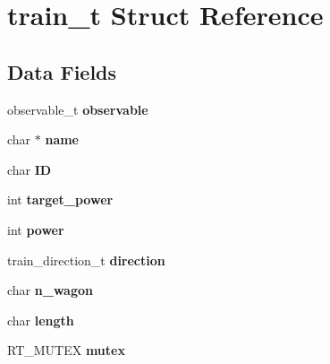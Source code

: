 \hypertarget{structtrain__t}{\section{train\-\_\-t \-Struct \-Reference}
\label{structtrain__t}
}
\subsection*{\-Data \-Fields}
\begin{DoxyCompactItemize}
\item 
\hypertarget{structtrain__t_a39d603215eb7e0ade0ee0fbbb14f0685}{observable\-\_\-t {\bfseries observable}}\label{structtrain__t_a39d603215eb7e0ade0ee0fbbb14f0685}

\item 
\hypertarget{structtrain__t_a866388e08694084c03d04d70c3c9541e}{char $\ast$ {\bfseries name}}\label{structtrain__t_a866388e08694084c03d04d70c3c9541e}

\item 
\hypertarget{structtrain__t_ab1d435bd12429c65c6cacfcba690e2f6}{char {\bfseries \-I\-D}}\label{structtrain__t_ab1d435bd12429c65c6cacfcba690e2f6}

\item 
\hypertarget{structtrain__t_aaca9fd05b60b4fae0e8e9c61373ebd28}{int {\bfseries target\-\_\-power}}\label{structtrain__t_aaca9fd05b60b4fae0e8e9c61373ebd28}

\item 
\hypertarget{structtrain__t_affb09a51187c77a7e31b3226d4768b4b}{int {\bfseries power}}\label{structtrain__t_affb09a51187c77a7e31b3226d4768b4b}

\item 
\hypertarget{structtrain__t_a395f5703d9b8bdb98cc5ecff8478bab1}{train\-\_\-direction\-\_\-t {\bfseries direction}}\label{structtrain__t_a395f5703d9b8bdb98cc5ecff8478bab1}

\item 
\hypertarget{structtrain__t_a573e717c3e431a70f049507500e3a3aa}{char {\bfseries n\-\_\-wagon}}\label{structtrain__t_a573e717c3e431a70f049507500e3a3aa}

\item 
\hypertarget{structtrain__t_a5b7a54e0da50f0c90d2771d5e6d156ab}{char {\bfseries length}}\label{structtrain__t_a5b7a54e0da50f0c90d2771d5e6d156ab}

\item 
\hypertarget{structtrain__t_acdc9afcb7663d7cae538ed1620c9b0e9}{\-R\-T\-\_\-\-M\-U\-T\-E\-X {\bfseries mutex}}\label{structtrain__t_acdc9afcb7663d7cae538ed1620c9b0e9}


\end{DoxyCompactItemize}
